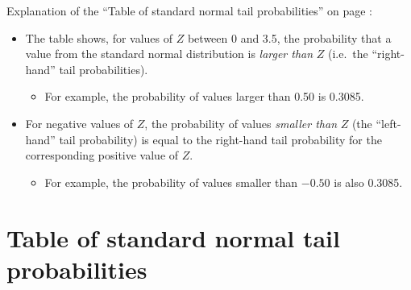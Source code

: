 Explanation of the ``Table of standard normal tail probabilities'' on
page \pageref{s_disttables_Z}:
\begin{itemize}
\item
The table shows, for values of $Z$ between 0 and 3.5, the probability
that a value from the standard normal distribution is \emph{larger than}
$Z$ (i.e.\ the ``right-hand'' tail probabilities).
\begin{itemize}
\item
For example, the probability of values larger than 0.50 is 0.3085.
\end{itemize}
\item
For negative values of $Z$, the probability of values \emph{smaller
than} $Z$ (the ``left-hand'' tail probability) is equal to the right-hand
tail probability for the corresponding positive value of $Z$.
\begin{itemize}
\item
For example, the probability of values smaller than $-0.50$ is also 0.3085.
\end{itemize}
\end{itemize}


\newpage
\section{Table of standard normal tail probabilities}
\label{s_disttables_Z}

